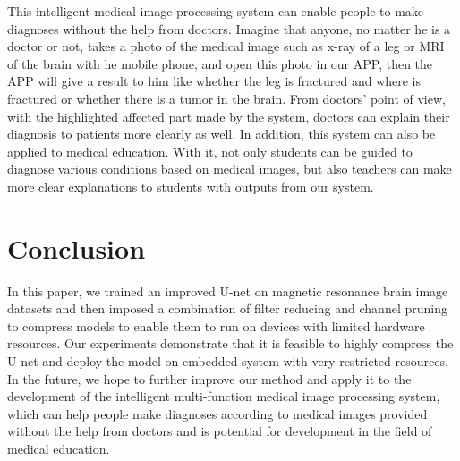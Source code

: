 \documentclass[sigconf]{acmart}
\begin{document}
This intelligent medical image processing system can enable people to make diagnoses without the help from doctors. Imagine that anyone, no matter he is a doctor or not, takes a photo of the medical image such as x-ray of a leg or MRI of the brain with he mobile phone, and open this photo in our APP, then the APP will give a result to him like whether the leg is fractured and where is fractured or whether there is a tumor in the brain. From doctors' point of view, with the highlighted affected part made by the system, doctors can explain their diagnosis to patients more clearly as well. In addition, this system can also be applied to medical education. With it, not only students can be guided to diagnose various conditions based on medical images, but also teachers can make more clear explanations to students with outputs from our system. 

\section{Conclusion}
In this paper, we trained an improved U-net\cite{improved-unet} on magnetic resonance brain image datasets and then imposed a combination of filter reducing and channel pruning to compress models to enable them to run on devices with limited hardware resources. Our experiments demonstrate that it is feasible to highly compress the U-net and deploy the model on embedded system with very restricted resources. In the future, we hope to further improve our method and apply it to the development of the intelligent multi-function medical image processing system, which can help people make diagnoses according to medical images provided without the help from doctors and is potential for development in the field of medical education.




\end{document}
